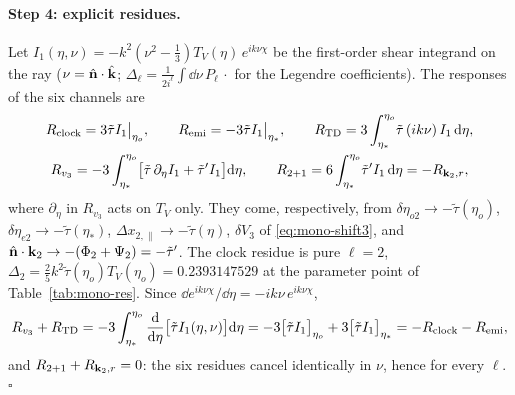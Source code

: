 \paragraph{Step 4: explicit residues.}  Let $I_1(\eta,\nu)=-k^2(\nu^2-\tfrac13)T_V(\eta)\,e^{ik\nu\chi}$ be the first-order shear integrand on the ray
($\nu=\hat{\mathbf n}\cdot\hat{\mathbf k}$; $\Delta_\ell=\frac1{2i^\ell}\int\dd\nu\,P_\ell\,\cdot$ for the Legendre coefficients).  The responses of the six channels are
\begin{equation}
\begin{gathered}
R_{\rm clock}=3\tilde\tau I_1\big|_{\eta_o},\qquad R_{\rm emi}=-3\tilde\tau I_1\big|_{\eta_*},\qquad
R_{\rm TD}=3\int_{\eta_*}^{\eta_o}\!\tilde\tau\,(ik\nu)\,I_1\,\mathrm d\eta,\\
R_{v_3}=-3\int_{\eta_*}^{\eta_o}\!\big[\tilde\tau\,\partial_\eta I_1+\tilde\tau' I_1\big]\mathrm d\eta,\qquad
R_{2+1}=6\int_{\eta_*}^{\eta_o}\!\tilde\tau' I_1\,\mathrm d\eta=-R_{\mathbf k_2,r},
\end{gathered}
\label{eq:mono-Rexpl}
\end{equation}
where $\partial_\eta$ in $R_{v_3}$ acts on $T_V$ only.  They come, respectively, from $\delta\eta_{o2}\to-\tilde\tau(\eta_o)$, $\delta\eta_{e2}\to-\tilde\tau(\eta_*)$,
$\Delta x_{2,\parallel}\to-\tilde\tau(\eta)$, $\delta V_3$ of \eqref{eq:mono-shift3}, and $\hat{\mathbf n}\cdot\mathbf k_2\to-(\Phi_2+\Psi_2)=-\tilde\tau'$.  The clock residue is pure
$\ell=2$, $\Delta_2=\tfrac25k^2\tilde\tau(\eta_o)T_V(\eta_o)=0.2393147529$ at the parameter point of Table~\ref{tab:mono-res}.  Since
$\dd e^{ik\nu\chi}/\dd\eta=-ik\nu\,e^{ik\nu\chi}$,
\begin{equation}
R_{v_3}+R_{\rm TD}=-3\int_{\eta_*}^{\eta_o}\frac{\mathrm d}{\mathrm d\eta}\big[\tilde\tau I_1(\eta,\nu)\big]\mathrm d\eta=-3\big[\tilde\tau I_1\big]_{\eta_o}+3\big[\tilde\tau I_1\big]_{\eta_*}
=-R_{\rm clock}-R_{\rm emi},
\end{equation}
and $R_{2+1}+R_{\mathbf k_2,r}=0$: the six residues cancel identically in $\nu$, hence for every $\ell$.  $\square$


